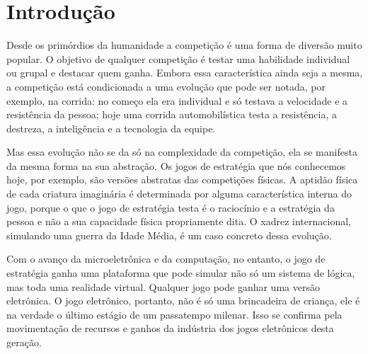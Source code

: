 \chapter{Introdução}
\label{cap:indtroducao}
%
Desde os primórdios da humanidade a competição é uma forma de diversão muito popular. O objetivo de qualquer competição é testar uma habilidade individual ou grupal e destacar quem ganha. Embora essa característica ainda seja a mesma, a competição está condicionada a uma evolução que pode ser notada, por exemplo, na corrida: no começo ela era individual e só testava a velocidade e a resistência da pessoa; hoje uma corrida automobilística testa a resistência, a destreza, a inteligência e a tecnologia da equipe.

Mas essa evolução não se da só na complexidade da competição, ela se manifesta da mesma forma na sua abstração. Os jogos de estratégia que nós conhecemos hoje, por exemplo, são versões abstratas das competições físicas. A aptidão física de cada criatura imaginária é determinada por alguma característica interna do jogo, porque o que o jogo de estratégia testa é o raciocínio e a estratégia da pessoa e não a sua capacidade física propriamente dita. O xadrez internacional, simulando uma guerra da Idade Média, é um caso concreto dessa evolução.

Com o avanço da microeletrônica e da computação, no entanto, o jogo de estratégia ganha uma plataforma que pode simular não só um sistema de lógica, mas toda uma realidade virtual. Qualquer jogo pode ganhar uma versão eletrônica. O jogo eletrônico, portanto, não é só uma brincadeira de criança, ele é na verdade o último estágio de um passatempo milenar. Isso se confirma pela movimentação de recursos e ganhos da indústria dos jogos eletrônicos desta geração.
%
%
